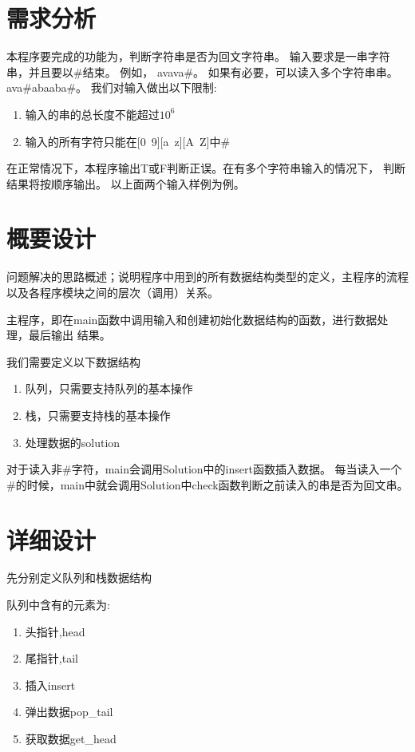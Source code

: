 \section{需求分析}

本程序要完成的功能为，判断字符串是否为回文字符串。
输入要求是一串字符串，并且要以\#结束。
例如，
avava\#。
如果有必要，可以读入多个字符串串。
ava\#abaaba\#。
我们对输入做出以下限制:
\begin{enumerate}
   \item 输入的串的总长度不能超过$10^6$
   \item 输入的所有字符只能在[0~9][a~z][A~Z]中\#
\end{enumerate}


在正常情况下，本程序输出T或F判断正误。在有多个字符串输入的情况下，
判断结果将按顺序输出。
以上面两个输入样例为例。



\section{概要设计}
   问题解决的思路概述；说明程序中用到的所有数据结构类型的定义，主程序的流程以及各程序模块之间的层次（调用）关系。
   
   
   主程序，即在main函数中调用输入和创建初始化数据结构的函数，进行数据处理，最后输出
   结果。


   我们需要定义以下数据结构
   \begin{enumerate}
      \item 队列，只需要支持队列的基本操作
      \item 栈，只需要支持栈的基本操作
      \item 处理数据的solution
   \end{enumerate}


   对于读入非\#字符，main会调用Solution中的insert函数插入数据。
   每当读入一个\#的时候，main中就会调用Solution中check函数判断之前读入的串是否为回文串。

\section{详细设计}

   先分别定义队列和栈数据结构


   队列中含有的元素为:
   \begin{enumerate}
      \item 头指针,head
      \item 尾指针,tail
      \item 插入insert
      \item 弹出数据pop\_tail
      \item 获取数据get\_head
   \end{enumerate}


